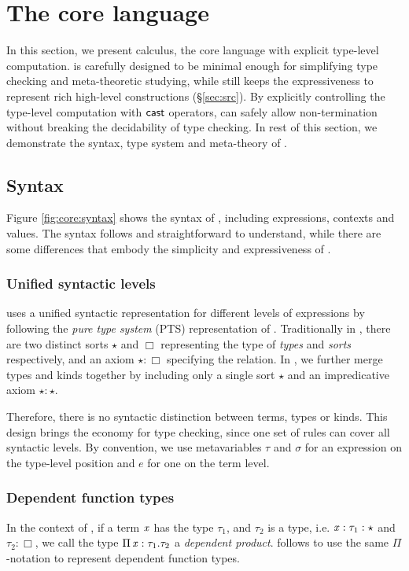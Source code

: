 \section{The core language}\label{sec:core}

In this section, we present \name calculus, the core language with explicit type-level computation. \name is carefully designed to be minimal enough for simplifying type checking and meta-theoretic studying, while still keeps the expressiveness to represent rich high-level constructions (\S \ref{sec:src}). By explicitly controlling the type-level computation with $\mathsf{cast}$ operators, \name can safely allow non-termination without breaking the decidability of type checking. In rest of this section, we demonstrate the syntax, type system and meta-theory of \name.

\subsection{Syntax}\label{sec:core:syn}
Figure \ref{fig:core:syntax} shows the syntax of \name, including expressions, contexts and values. The syntax follows \cc and straightforward to understand, while there are some differences that embody the simplicity and expressiveness of \name.

\subsubsection{Unified syntactic levels}
\name uses a unified syntactic representation for different levels of expressions by following the \emph{pure type system} (PTS) representation of \cc. Traditionally in \cc, there are two distinct sorts $\star$ and $\Box$ representing the type of \emph{types} and \emph{sorts} respectively, and an axiom $\star:\Box$ specifying the relation. In \name, we further merge types and kinds together by including only a single sort $\star$ and an impredicative axiom $\star:\star$. 

Therefore, there is no syntactic distinction between terms, types or kinds. This design brings the economy for type checking, since one set of rules can cover all syntactic levels. By convention, we use metavariables $\tau$ and $\sigma$ for an expression on the type-level position and $e$ for one on the term level.

\subsubsection{Dependent function types}
In the context of \cc, if a term $\mathit{x}$ has the type $\tau_{{\mathrm{1}}}$, and $\tau_{{\mathrm{2}}}$ is a type, i.e. $\mathit{x}:\tau_{{\mathrm{1}}}:\star$ and $\tau_{{\mathrm{2}}}:\Box$, we call the type $\Pi \, \mathit{x}  :  \tau_{{\mathrm{1}}}  .  \tau_{{\mathrm{2}}}$ a \emph{dependent product}. \name follows \cc to use the same $ \Pi $-notation to represent dependent function types.

